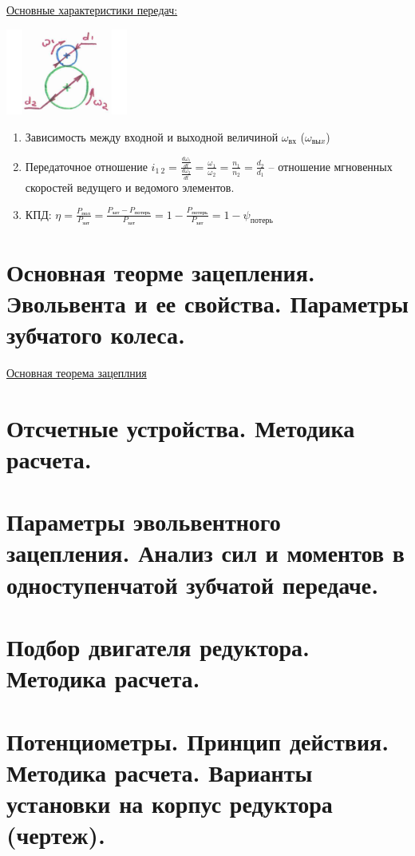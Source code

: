 \documentclass{article}
\begin{document}
\begin{multicols}{3}
\underline{Основные характеристики передач:}

\includegraphics[width = 0.3\textwidth]{6_1}

\begin{enumerate}
	\item Зависимость между входной и выходной величиной $\omega_{вх}$ ($\omega_{выx}$)
	\item Передаточное отношение $i_{1\:2} = \frac{ \frac{d\omega_1}{dt} }{ \frac{d\omega_2}{dt} } = \frac{\omega_1}{\omega_2} = \frac{n_1}{n_2} = \frac{d_2}{d_1} $ -- отношение
	мгновенных скоростей ведущего и ведомого элементов.
	\item  КПД: $\eta = \frac{P_{пол}}{P_{зат}} = \frac{P_{зат} - P_{потерь}}{P_{зат}} = 1 - \frac{P_{потерь}}{P_{зат}} = 1 - \psi_{потерь} $
\end{enumerate}

\section {\tiny Основная теорме зацепления. Эвольвента и ее свойства. Параметры зубчатого колеса.}

\underline{Основная теорема зацеплния} 

\section {\tiny Отсчетные устройства. Методика расчета.}

\section {\tiny Параметры эвольвентного зацепления. Анализ сил и моментов в одноступенчатой зубчатой передаче.}

\section {\tiny Подбор двигателя редуктора. Методика расчета.}

\section {\tiny Потенциометры. Принцип действия. Методика расчета. Варианты установки на корпус редуктора (чертеж).}


\end{multicols}
\end{document}
